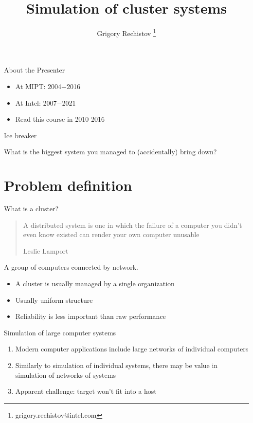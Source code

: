 

\author{Grigory Rechistov \thanks{grigory.rechistov@intel.com}}
\title{Simulation of cluster systems}



\startslides

\begin{frame}{About the Presenter}
\begin{itemize}
\item At MIPT: 2004−2016
\item At Intel: 2007−2021
\item Read this course in 2010-2016
\end{itemize}
\end{frame}

\begin{frame}{Ice breaker}

What is the biggest system you managed to (accidentally) bring down?

\end{frame}


\section{Problem definition}

\begin{frame}{What is a cluster?}

\pause
\begin{quotation}
A distributed system is one in which the failure of a computer you didn't even know existed can render your own computer unusable

Leslie Lamport
\end{quotation}
\pause

A group of computers connected by network.

\begin{itemize}
    \item A cluster is usually managed by a single organization
    \item Usually uniform structure
    \item Reliability is less important than raw performance
\end{itemize}

\end{frame}

\begin{frame}{Simulation of large computer systems}

\begin{enumerate}
    \item Modern computer applications include large networks of individual computers
    \item Similarly to simulation of individual systems, there may be value in simulation of networks of systems
    \item Apparent challenge: target won't fit into a host
\end{enumerate}

\end{frame}

